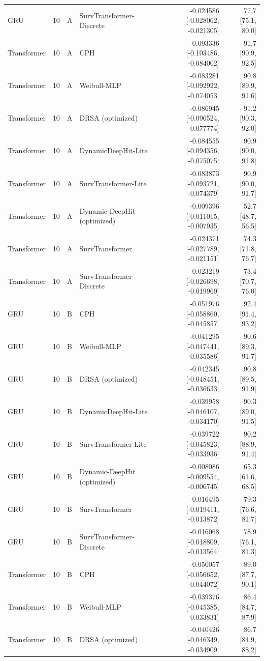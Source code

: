 \begin{longtable}{lll p{3.0cm} rr}
GRU & 10 & A & SurvTransformer-Discrete & -0.024586 [-0.028062, -0.021305] & 77.7 [75.1, 80.0]\\
Transformer & 10 & A & CPH & -0.093336 [-0.103486, -0.084002] & 91.7 [90.9, 92.5]\\
Transformer & 10 & A & Weibull-MLP & -0.083281 [-0.092922, -0.074053] & 90.8 [89.9, 91.6]\\
Transformer & 10 & A & DRSA (optimized) & -0.086945 [-0.096524, -0.077774] & 91.2 [90.3, 92.0]\\
Transformer & 10 & A & DynamicDeepHit-Lite & -0.084555 [-0.094356, -0.075075] & 90.9 [90.0, 91.8]\\
Transformer & 10 & A & SurvTransformer-Lite & -0.083873 [-0.093721, -0.074379] & 90.9 [90.0, 91.7]\\
Transformer & 10 & A & Dynamic-DeepHit (optimized) & -0.009396 [-0.011015, -0.007935] & 52.7 [48.7, 56.5]\\
Transformer & 10 & A & SurvTransformer & -0.024371 [-0.027789, -0.021151] & 74.3 [71.8, 76.7]\\
Transformer & 10 & A & SurvTransformer-Discrete & -0.023219 [-0.026698, -0.019969] & 73.4 [70.7, 76.0]\\
GRU & 10 & B & CPH & -0.051976 [-0.058860, -0.045857] & 92.4 [91.4, 93.2]\\
GRU & 10 & B & Weibull-MLP & -0.041295 [-0.047441, -0.035586] & 90.6 [89.3, 91.7]\\
GRU & 10 & B & DRSA (optimized) & -0.042345 [-0.048451, -0.036633] & 90.8 [89.5, 91.9]\\
GRU & 10 & B & DynamicDeepHit-Lite & -0.039958 [-0.046107, -0.034170] & 90.3 [89.0, 91.5]\\
GRU & 10 & B & SurvTransformer-Lite & -0.039722 [-0.045823, -0.033936] & 90.2 [88.9, 91.4]\\
GRU & 10 & B & Dynamic-DeepHit (optimized) & -0.008086 [-0.009554, -0.006745] & 65.3 [61.6, 68.5]\\
GRU & 10 & B & SurvTransformer & -0.016495 [-0.019411, -0.013872] & 79.3 [76.6, 81.7]\\
GRU & 10 & B & SurvTransformer-Discrete & -0.016068 [-0.018809, -0.013564] & 78.9 [76.1, 81.3]\\
Transformer & 10 & B & CPH & -0.050057 [-0.056652, -0.044072] & 89.0 [87.7, 90.1]\\
Transformer & 10 & B & Weibull-MLP & -0.039376 [-0.045385, -0.033831] & 86.4 [84.7, 87.9]\\
Transformer & 10 & B & DRSA (optimized) & -0.040426 [-0.046349, -0.034909] & 86.7 [84.9, 88.2]\\

\end{longtable}
